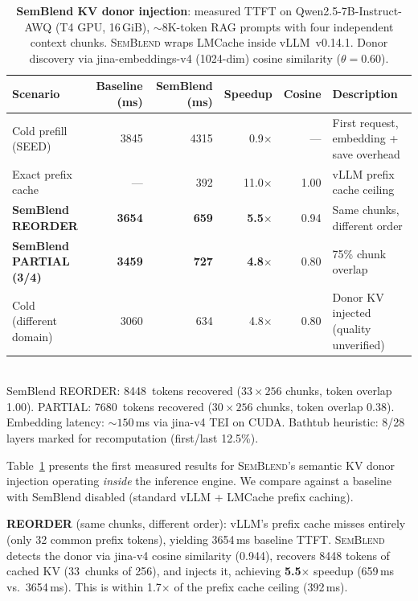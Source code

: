 \documentclass[11pt,twocolumn]{article}
\newcommand{\semblend}{\textsc{SemBlend}\xspace}
\begin{document}
\begin{table}[t]
\centering
\caption{\textbf{SemBlend KV donor injection}: measured TTFT on
Qwen2.5-7B-Instruct-AWQ (T4 GPU, 16\,GiB), ${\sim}8\text{K}$-token
RAG prompts with four independent context chunks. \semblend wraps
LMCache inside vLLM~v0.14.1. Donor discovery via jina-embeddings-v4
(1024-dim) cosine similarity ($\theta{=}0.60$).}
\label{tab:semblend-injection}
\scriptsize
\setlength{\tabcolsep}{4pt}
\begin{tabular}{@{}lrrrrp{4.8cm}@{}}
\toprule
\textbf{Scenario} & \textbf{Baseline (ms)} & \textbf{SemBlend (ms)} & \textbf{Speedup} & \textbf{Cosine} & \textbf{Description} \\
\midrule
Cold prefill (SEED) & 3845 & 4315 & 0.9$\times$ & --- & First request, embedding + save overhead \\
Exact prefix cache  & --- & 392 & 11.0$\times$ & 1.00 & vLLM prefix cache ceiling \\
\textbf{SemBlend REORDER} & \textbf{3654} & \textbf{659} & \textbf{5.5$\times$} & 0.94 & Same chunks, different order \\
\textbf{SemBlend PARTIAL (3/4)} & \textbf{3459} & \textbf{727} & \textbf{4.8$\times$} & 0.80 & 75\% chunk overlap \\
Cold (different domain) & 3060 & 634 & 4.8$\times$ & 0.80 & Donor KV injected (quality unverified) \\
\bottomrule
\end{tabular}\\[2pt]
{\footnotesize SemBlend REORDER: 8448~tokens recovered ($33 \times 256$ chunks, token overlap 1.00).
PARTIAL: 7680~tokens recovered ($30 \times 256$ chunks, token overlap 0.38).
Embedding latency: ${\sim}150$\,ms via jina-v4 TEI on CUDA.
Bathtub heuristic: 8/28 layers marked for recomputation (first/last 12.5\%).}
\end{table}

Table~\ref{tab:semblend-injection} presents the first measured results
for \semblend's semantic KV donor injection operating \emph{inside}
the inference engine. We compare against a baseline with SemBlend
disabled (standard vLLM + LMCache prefix caching).

\textbf{REORDER} (same chunks, different order): vLLM's prefix cache
misses entirely (only 32 common prefix tokens), yielding 3654\,ms
baseline TTFT. \semblend detects the donor via jina-v4 cosine
similarity (0.944), recovers 8448 tokens of cached KV (33~chunks of
256), and injects it, achieving \textbf{5.5$\times$} speedup (659\,ms
vs.\ 3654\,ms). This is within 1.7$\times$ of the prefix cache ceiling
(392\,ms).
\end{document}
